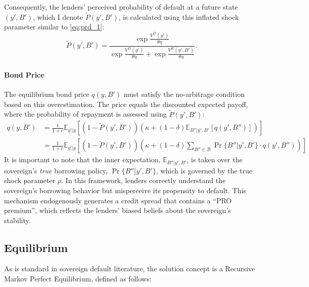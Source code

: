\documentclass[12pt]{article}
\theoremstyle{plain}
\begin{document}
Consequently, the lenders' perceived probability of default at a future state
$(y', B')$, which I denote $\tilde{P}(y', B')$, is calculated using this
inflated shock parameter similar to \eqref{eq:prd_1}:
\begin{equation}
	\tilde{P}(y', B') = \frac{\exp\frac{V^D(y')}{\theta\eta}}{\exp\frac{V^D(y')}{\theta\eta}+\exp\frac{V^R(y',B')}{\theta\eta}}.
	\label{eq:plender}
\end{equation}

\paragraph{Bond Price}The equilibrium bond price $q(y, B')$ must satisfy the no-arbitrage condition
based on this overestimation. The price equals the discounted expected payoff,
where the probability of repayment is assessed using $\tilde{P}(y', B')$:
\begin{equation}
	\begin{aligned}
		q(y, B') & = \frac{1}{1+r} \mathbb{E}_{y'|y} \left[ \left(1 - \tilde{P}(y', B') \right) \left( \kappa + (1-\delta) \mathbb{E}_{B''|y',B'} \left[ q(y', B'') \right] \right) \right]            \\
		         & = \frac{1}{1+r} \mathbb{E}_{y'|y} \left[ \left(1 - \tilde{P}(y', B') \right) \left( \kappa + (1-\delta)\sum_{B'' \in \mathcal{B}} \Pr\{B''|y', B'\}\cdot q(y', B'') \right) \right]
	\end{aligned}
	\label{eq:qprice_biased}
\end{equation}
It is important to note that the inner expectation, $\mathbb{E}_{B''|y',B'}$, is taken over the sovereign's \textit{true} borrowing policy, $\Pr\{B''|y', B'\}$, which is governed by the true shock parameter $\rho$. In this framework, lenders correctly understand the sovereign's borrowing behavior but misperceive its propensity to default. This mechanism endogenously generates a credit spread that contains a ``PRO premium'', which reflects the lenders' biased beliefs about the sovereign's stability.

\subsection{Equilibrium}

As is standard in sovereign default literature, the solution concept is a
Recursive Markov Perfect Equilibrium, defined as follows:
\end{document}

